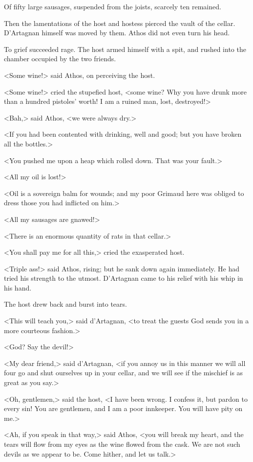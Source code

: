 Of fifty large sausages, suspended from the joists, scarcely ten remained. 

Then the lamentations of the host and hostess pierced the vault of the cellar. D'Artagnan himself was moved by them. Athos did not even turn his head. 

To grief succeeded rage. The host armed himself with a spit, and rushed into the chamber occupied by the two friends. 

<Some wine!> said Athos, on perceiving the host. 

<Some wine!> cried the stupefied host, <some wine? Why you have drunk more than a hundred pistoles' worth! I am a ruined man, lost, destroyed!> 

<Bah,> said Athos, <we were always dry.> 

<If you had been contented with drinking, well and good; but you have broken all the bottles.> 

<You pushed me upon a heap which rolled down. That was your fault.> 

<All my oil is lost!> 

<Oil is a sovereign balm for wounds; and my poor Grimaud here was obliged to dress those you had inflicted on him.> 

<All my sausages are gnawed!> 

<There is an enormous quantity of rats in that cellar.> 

<You shall pay me for all this,> cried the exasperated host. 

<Triple ass!> said Athos, rising; but he sank down again immediately. He had tried his strength to the utmost. D'Artagnan came to his relief with his whip in his hand. 

The host drew back and burst into tears. 

<This will teach you,> said d'Artagnan, <to treat the guests God sends you in a more courteous fashion.> 

<God? Say the devil!> 

<My dear friend,> said d'Artagnan, <if you annoy us in this manner we will all four go and shut ourselves up in your cellar, and we will see if the mischief is as great as you say.> 

<Oh, gentlemen,> said the host, <I have been wrong. I confess it, but pardon to every sin! You are gentlemen, and I am a poor innkeeper. You will have pity on me.> 

<Ah, if you speak in that way,> said Athos, <you will break my heart, and the tears will flow from my eyes as the wine flowed from the cask. We are not such devils as we appear to be. Come hither, and let us talk.> 

